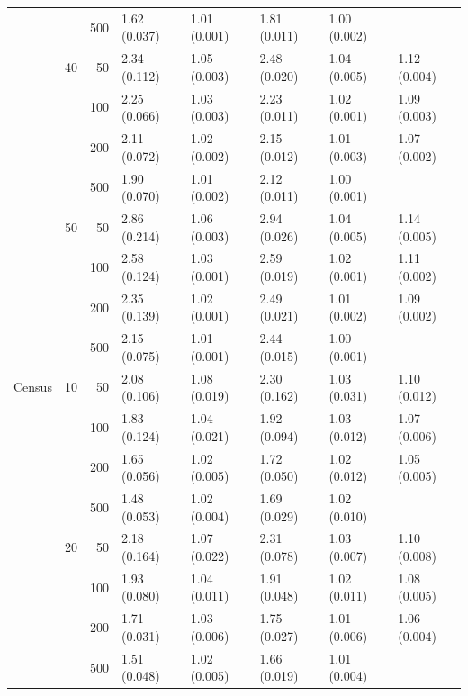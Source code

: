 \begin{longtable}{p{}lrlllll}
      &     & 500 &   1.62 (0.037) &   1.01 (0.001) &   1.81 (0.011) &         1.00 (0.002) &            \\
      & 40  & 50  &   2.34 (0.112) &   1.05 (0.003) &   2.48 (0.020) &         1.04 (0.005) &  1.12 (0.004) \\
      &     & 100 &   2.25 (0.066) &   1.03 (0.003) &   2.23 (0.011) &         1.02 (0.001) &  1.09 (0.003) \\
      &     & 200 &   2.11 (0.072) &   1.02 (0.002) &   2.15 (0.012) &         1.01 (0.003) &  1.07 (0.002) \\
      &     & 500 &   1.90 (0.070) &   1.01 (0.002) &   2.12 (0.011) &         1.00 (0.001) &            \\
      & 50  & 50  &   2.86 (0.214) &   1.06 (0.003) &   2.94 (0.026) &         1.04 (0.005) &  1.14 (0.005) \\
      &     & 100 &   2.58 (0.124) &   1.03 (0.001) &   2.59 (0.019) &         1.02 (0.001) &  1.11 (0.002) \\
      &     & 200 &   2.35 (0.139) &   1.02 (0.001) &   2.49 (0.021) &         1.01 (0.002) &  1.09 (0.002) \\
      &     & 500 &   2.15 (0.075) &   1.01 (0.001) &   2.44 (0.015) &         1.00 (0.001) &            \\
\midrule
Census & 10  & 50  &   2.08 (0.106) &   1.08 (0.019) &   2.30 (0.162) &         1.03 (0.031) &  1.10 (0.012) \\
      &     & 100 &   1.83 (0.124) &   1.04 (0.021) &   1.92 (0.094) &         1.03 (0.012) &  1.07 (0.006) \\
      &     & 200 &   1.65 (0.056) &   1.02 (0.005) &   1.72 (0.050) &         1.02 (0.012) &  1.05 (0.005) \\
      &     & 500 &   1.48 (0.053) &   1.02 (0.004) &   1.69 (0.029) &         1.02 (0.010) &            \\
      & 20  & 50  &   2.18 (0.164) &   1.07 (0.022) &   2.31 (0.078) &         1.03 (0.007) &  1.10 (0.008) \\
      &     & 100 &   1.93 (0.080) &   1.04 (0.011) &   1.91 (0.048) &         1.02 (0.011) &  1.08 (0.005) \\
      &     & 200 &   1.71 (0.031) &   1.03 (0.006) &   1.75 (0.027) &         1.01 (0.006) &  1.06 (0.004) \\
      &     & 500 &   1.51 (0.048) &   1.02 (0.005) &   1.66 (0.019) &         1.01 (0.004) &            \\

\end{longtable}
